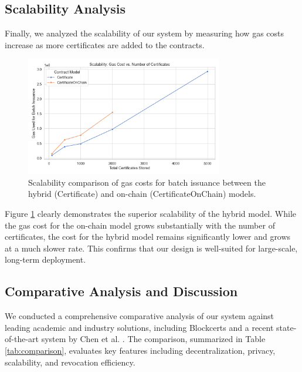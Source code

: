 \documentclass[lettersize,journal]{IEEEtran}
\begin{document}
\begin{itemize}
\subsection{Scalability Analysis}
Finally, we analyzed the scalability of our system by measuring how gas costs increase as more certificates are added to the contracts.

\begin{figure}[!h]
\centering
\includegraphics[width=3.4in]{figures/scalability_comparison.png}
\caption{Scalability comparison of gas costs for batch issuance between the hybrid (Certificate) and on-chain (CertificateOnChain) models.}
\label{fig:scalability}
\end{figure}

Figure \ref{fig:scalability} clearly demonstrates the superior scalability of the hybrid model. While the gas cost for the on-chain model grows substantially with the number of certificates, the cost for the hybrid model remains significantly lower and grows at a much slower rate. This confirms that our design is well-suited for large-scale, long-term deployment.

\subsection{Comparative Analysis and Discussion}

We conducted a comprehensive comparative analysis of our system against leading academic and industry solutions, including Blockcerts \cite{blockcerts} and a recent state-of-the-art system by Chen et al. \cite{chen2023}. The comparison, summarized in Table \ref{tab:comparison}, evaluates key features including decentralization, privacy, scalability, and revocation efficiency.


\end{itemize}
\end{document}
